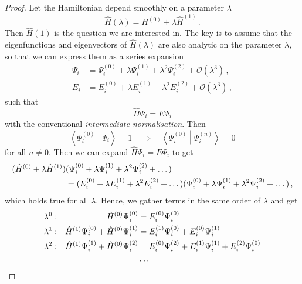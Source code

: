 \documentclass{article}
\theoremstyle{plain}\theoremheaderfont{\normalfont\itshape}\theorembodyfont{\rmfamily}\theoremseparator{.}\newtheorem*{rem}{Remark}\newtheorem*{ex}{Example}\newtheorem*{proof}{Proof}\newtheorem*{altp}{Alternative proof}
\theoremstyle{plain}\theoremheaderfont{\normalfont\bfseries}\theorembodyfont{\rmfamily}\theoremseparator{.}\newtheorem{thm}{Theorem}[section]\newtheorem{lem}[thm]{Lemma}\newtheorem{prop}[thm]{Proposition}\newtheorem*{cor}{Corollary}\newtheorem{defn}[thm]{Definition}\newtheorem{clm}[thm]{Claim}\newtheorem{clminproof}{Claim}
\theoremstyle{break}\theoremheaderfont{\normalfont\itshape}\theorembodyfont{\rmfamily}\theoremseparator{.\medskip}\newtheorem*{proofskip}{Proof}\newtheorem*{exs}{Examples}\newtheorem*{rems}{Remarks}
\theoremstyle{break}\theoremheaderfont{\normalfont\bfseries}\theorembodyfont{\rmfamily}\theoremseparator{.\medskip}\newtheorem{lemskip}[thm]{Lemma}\newtheorem{defnskip}[thm]{Definition}\newtheorem{propskip}[thm]{Proposition}\newtheorem{thmskip}[thm]{Theorem}
\numberwithin{equation}{section}
\newcommand{\braket}[2]{\left\langle #1 \middle| #2 \right\rangle}
\begin{document}
    \begin{proof}
        Let the Hamiltonian depend smoothly on a parameter \(\lambda\)
        \begin{equation}
            \hat{H}(\lambda)=H^{(0)}+\lambda\hat{H}^{(1)}\,.
        \end{equation}
        Then \(\hat{H}(1)\) is the question we are interested in. The key is to assume that the eigenfunctions and eigenvectors of \(\hat{H}(\lambda)\) are also analytic on the parameter \(\lambda\), so that we can express them as a series expansion
        \begin{align}
            \Psi_i&=\Psi_i^{(0)}+\lambda\Psi_i^{(1)}+\lambda^2\Psi_i^{(2)}+\mathcal{O}(\lambda^3)\,, \\
            E_i&=E_i^{(0)}+\lambda E_i^{(1)}+\lambda^2 E_i^{(2)}+\mathcal{O}(\lambda^3)\,,
        \end{align}
        such that
        \begin{equation}
            \hat{H}\Psi_i=E\Psi_i
        \end{equation}
        with the conventional \textit{intermediate normalisation}. Then
        \begin{equation}
            \braket{\Psi_i^{(0)}}{\Psi_i}=1\quad\Rightarrow\quad\braket{\Psi_i^{(0)}}{\Psi_i^{(n)}}=0
        \end{equation}
        for all \(n\ne 0\). Then we can expand \(\hat{H}\Psi_i=E\Psi_i\) to get
        \begin{align}
            (\hat{H}^{(0)}+\lambda\hat{H}^{(1)})&(\Psi_i^{(0)}+\lambda\Psi_i^{(1)}+\lambda^2\Psi_i^{(2)}+\dots) \notag \\
            &=(E_i^{(0)}+\lambda E_i^{(1)}+\lambda^2 E_i^{(2)}+\dots)(\Psi_i^{(0)}+\lambda\Psi_i^{(1)}+\lambda^2\Psi_i^{(2)}+\dots)\,,
        \end{align}
        which holds true for all \(\lambda\). Hence, we gather terms in the same order of \(\lambda\) and get
        \begin{align}
            \lambda^0:&& \hat{H}^{(0)}\Psi_i^{(0)}&=E_i^{(0)}\Psi_i^{(0)}\\
            \lambda^1:&& \hat{H}^{(1)}\Psi_i^{(0)}+\hat{H}^{(0)}\Psi_i^{(1)}&=E_i^{(1)}\Psi_i^{(0)}+E_i^{(0)}\Psi_i^{(1)}\\
            \lambda^2:&& \hat{H}^{(1)}\Psi_i^{(1)}+\hat{H}^{(0)}\Psi_i^{(2)}&=E_i^{(0)}\Psi_i^{(2)}+E_i^{(1)}\Psi_i^{(1)}+E_i^{(2)}\Psi_i^{(0)}\\
            && &\dots \notag
        \end{align}

\end{proof}
\end{document}
